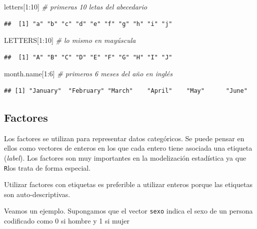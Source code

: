 \documentclass[
]{book}
\newenvironment{Shaded}{\begin{snugshade}}{\end{snugshade}}
\newcommand{\CommentTok}[1]{\textcolor[rgb]{0.56,0.35,0.01}{\textit{#1}}}
\newcommand{\DecValTok}[1]{\textcolor[rgb]{0.00,0.00,0.81}{#1}}
\newcommand{\NormalTok}[1]{#1}
\newcommand{\SpecialCharTok}[1]{\textcolor[rgb]{0.00,0.00,0.00}{#1}}
\theoremstyle{break}
\begin{document}
\begin{Shaded}
\begin{Highlighting}[]
\NormalTok{letters[}\DecValTok{1}\SpecialCharTok{:}\DecValTok{10}\NormalTok{]  }\CommentTok{\# primeras 10 letas del abecedario}
\end{Highlighting}
\end{Shaded}

\begin{verbatim}
##  [1] "a" "b" "c" "d" "e" "f" "g" "h" "i" "j"
\end{verbatim}

\begin{Shaded}
\begin{Highlighting}[]
\NormalTok{LETTERS[}\DecValTok{1}\SpecialCharTok{:}\DecValTok{10}\NormalTok{]  }\CommentTok{\# lo mismo en mayúscula}
\end{Highlighting}
\end{Shaded}

\begin{verbatim}
##  [1] "A" "B" "C" "D" "E" "F" "G" "H" "I" "J"
\end{verbatim}

\begin{Shaded}
\begin{Highlighting}[]
\NormalTok{month.name[}\DecValTok{1}\SpecialCharTok{:}\DecValTok{6}\NormalTok{]  }\CommentTok{\# primeros 6 meses del año en inglés}
\end{Highlighting}
\end{Shaded}

\begin{verbatim}
## [1] "January"  "February" "March"    "April"    "May"      "June"
\end{verbatim}

\hypertarget{factores}{%
\subsection{Factores}\label{factores}}

Los factores se utilizan para representar datos categóricos. Se
puede pensar en ellos como vectores de enteros en los que cada entero
tiene asociada una etiqueta (\emph{label}). Los factores son muy importantes
en la modelización estadística ya que \texttt{R}los trata de forma especial.

Utilizar factores con etiquetas es preferible a utilizar enteros porque
las etiquetas son auto-descriptivas.

Veamos un ejemplo. Supongamos que el vector \texttt{sexo} indica el sexo de un
persona codificado como 0 si hombre y 1 si mujer
\end{document}
